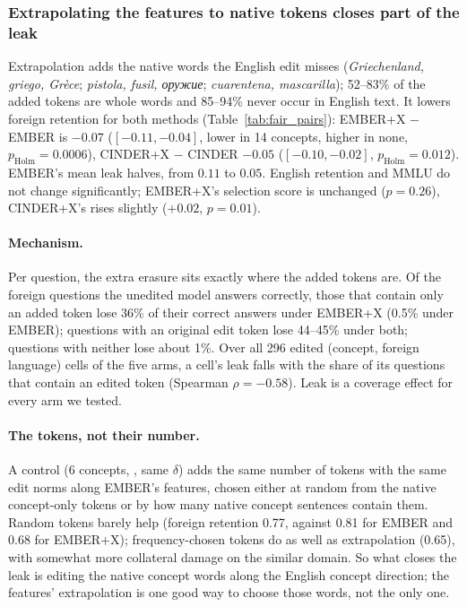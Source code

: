 \subsubsection{Extrapolating the features to native tokens closes part of the leak}

Extrapolation adds the native words the English edit misses (\emph{Griechenland, griego, Grèce}; \emph{pistola, fusil, оружие}; \emph{cuarentena, mascarilla}); 52--83\% of the added tokens are whole words and 85--94\% never occur in English text.
It lowers foreign retention for both methods (Table~\ref{tab:fair_pairs}): EMBER+X $-$ EMBER is $-0.07$ ($[-0.11,-0.04]$, lower in 14 concepts, higher in none, $p_{\text{Holm}} = 0.0006$), CINDER+X $-$ CINDER $-0.05$ ($[-0.10,-0.02]$, $p_{\text{Holm}} = 0.012$).
EMBER's mean leak halves, from $0.11$ to $0.05$.
English retention and MMLU do not change significantly; EMBER+X's selection score is unchanged ($p = 0.26$), CINDER+X's rises slightly ($+0.02$, $p = 0.01$).

\paragraph{Mechanism.}
Per question, the extra erasure sits exactly where the added tokens are.
Of the foreign questions the unedited model answers correctly, those that contain only an added token lose 36\% of their correct answers under EMBER+X (0.5\% under EMBER); questions with an original edit token lose 44--45\% under both; questions with neither lose about 1\%.
Over all 296 edited (concept, foreign language) cells of the five arms, a cell's leak falls with the share of its questions that contain an edited token (Spearman $\rho = -0.58$).
Leak is a coverage effect for every arm we tested.

\paragraph{The tokens, not their number.}
A control (6 concepts, \qatrain{}, same $\delta$) adds the same number of tokens with the same edit norms along EMBER's features, chosen either at random from the native concept-only tokens or by how many native concept sentences contain them.
Random tokens barely help (foreign retention 0.77, against 0.81 for EMBER and 0.68 for EMBER+X); frequency-chosen tokens do as well as extrapolation (0.65), with somewhat more collateral damage on the similar domain.
So what closes the leak is editing the native concept words along the English concept direction; the features' extrapolation is one good way to choose those words, not the only one.

